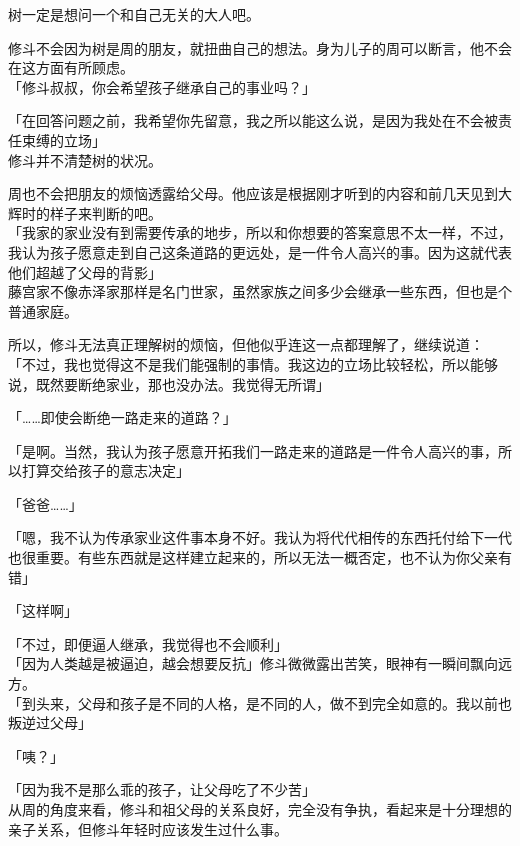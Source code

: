 树一定是想问一个和自己无关的大人吧。

修斗不会因为树是周的朋友，就扭曲自己的想法。身为儿子的周可以断言，他不会在这方面有所顾虑。\\

「修斗叔叔，你会希望孩子继承自己的事业吗？」

「在回答问题之前，我希望你先留意，我之所以能这么说，是因为我处在不会被责任束缚的立场」\\

修斗并不清楚树的状况。

周也不会把朋友的烦恼透露给父母。他应该是根据刚才听到的内容和前几天见到大辉时的样子来判断的吧。\\

「我家的家业没有到需要传承的地步，所以和你想要的答案意思不太一样，不过，我认为孩子愿意走到自己这条道路的更远处，是一件令人高兴的事。因为这就代表他们超越了父母的背影」\\

藤宫家不像赤泽家那样是名门世家，虽然家族之间多少会继承一些东西，但也是个普通家庭。

所以，修斗无法真正理解树的烦恼，但他似乎连这一点都理解了，继续说道：\\

「不过，我也觉得这不是我们能强制的事情。我这边的立场比较轻松，所以能够说，既然要断绝家业，那也没办法。我觉得无所谓」

「……即使会断绝一路走来的道路？」

「是啊。当然，我认为孩子愿意开拓我们一路走来的道路是一件令人高兴的事，所以打算交给孩子的意志决定」

「爸爸……」

「嗯，我不认为传承家业这件事本身不好。我认为将代代相传的东西托付给下一代也很重要。有些东西就是这样建立起来的，所以无法一概否定，也不认为你父亲有错」

「这样啊」

「不过，即便逼人继承，我觉得也不会顺利」\\

「因为人类越是被逼迫，越会想要反抗」修斗微微露出苦笑，眼神有一瞬间飘向远方。\\

「到头来，父母和孩子是不同的人格，是不同的人，做不到完全如意的。我以前也叛逆过父母」

「咦？」

「因为我不是那么乖的孩子，让父母吃了不少苦」\\

从周的角度来看，修斗和祖父母的关系良好，完全没有争执，看起来是十分理想的亲子关系，但修斗年轻时应该发生过什么事。

